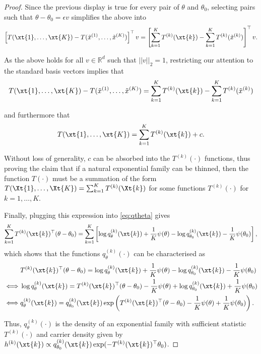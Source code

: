 \documentclass[12pt]{article}
\begin{document}
\begin{proof}
Since the previous display is true for every pair of $\theta$ and $\theta_0$, selecting pairs such that $\theta-\theta_0=\epsilon v$ simplifies the above into
$$
\left[T(\xt{1},\dots,\xt{K})- T(\tilde{x}^{(1)},\dots,\tilde{x}^{(K)})\right]^\top v 
= \left[\sum_{k=1}^KT^{(k)}(\xt{k})-\sum_{k=1}^KT^{(k)}(\tilde{x}^{(k)})\right]^\top v.
$$

As the above holds for all $v\in\mathbb{R}^d$ such that $||v||_2=1$, restricting our attention to the standard basis vectors implies that 
$$
T(\xt{1},\dots,\xt{K})- T(\tilde{x}^{(1)},\dots,\tilde{x}^{(K)})
= \sum_{k=1}^KT^{(k)}(\xt{k})-\sum_{k=1}^KT^{(k)}(\tilde{x}^{(k)})
$$

and furthermore that 
$$
T(\xt{1},\dots,\xt{K})
= \sum_{k=1}^KT^{(k)}(\xt{k})+c.
$$


Without loss of generality, $c$ can be absorbed into the $T^{(k)}(\cdot)$ functions, thus proving the claim that if a natural exponential family can be thinned, then the function $T(\cdot)$ must be a summation of the form $T(\Xt{1},\dots,\Xt{K})=\sum_{k=1}^K T^{(k)}(\Xt{k})$ for some functions $T^{(k)}(\cdot)$ for $k=1,\dots,K$.

Finally, plugging this expression into \eqref{eq:qtheta} gives
$$
\sum_{k=1}^KT^{(k)}(\xt{k})^\top(\theta-\theta_0)  = \sum_{k=1}^K \left[\log q^{(k)}_\theta(\xt{k}) + \frac{1}{K}\psi(\theta) - \log q^{(k)}_{\theta_0}(\xt{k}) - \frac{1}{K}\psi(\theta_0)\right], 
$$
which shows that the functions $q_\theta^{(k)}(\cdot)$ can be characterised as
\begin{align*}
&T^{(k)}(\xt{k})^\top (\theta-\theta_0) = \log q^{(k)}_\theta(\xt{k}) + \frac{1}{K}\psi(\theta) - \log q^{(k)}_{\theta_0}(\xt{k}) - \frac{1}{K}\psi(\theta_0) \\
\iff&\log q^{(k)}_\theta(\xt{k}) = T^{(k)}(\xt{k})^\top (\theta-\theta_0) - \frac{1}{K}\psi(\theta) + \log q^{(k)}_{\theta_0}(\xt{k}) + \frac{1}{K}\psi(\theta_0) \\
\iff& q^{(k)}_\theta(\xt{k}) =  q^{(k)}_{\theta_0}(\xt{k})\exp\left(T^{(k)}(\xt{k})^\top (\theta-\theta_0) - \frac{1}{K}\psi(\theta) + \frac{1}{K}\psi(\theta_0)\right).
\end{align*}

Thus, $q_\theta^{(k)}(\cdot)$ is the density of an exponential family with sufficient statistic $T^{(k)}(\cdot)$ and carrier density given by $h^{(k)}(\xt{k})\propto q^{(k)}_{\theta_0}(\xt{k})\exp(-T^{(k)}(\xt{k})^\top \theta_0)$.

\end{proof}
\end{document}
